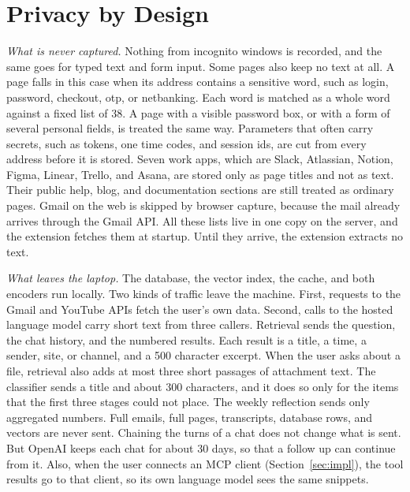 \documentclass[conference]{IEEEtran}
\begin{document}
\section{Privacy by Design}\label{sec:privacy}
\textit{What is never captured.} Nothing from incognito windows is recorded, and the same goes for typed text and form input. Some pages also keep no text at all. A page falls in this case when its address contains a sensitive word, such as login, password, checkout, otp, or netbanking. Each word is matched as a whole word against a fixed list of 38. A page with a visible password box, or with a form of several personal fields, is treated the same way. Parameters that often carry secrets, such as tokens, one time codes, and session ids, are cut from every address before it is stored. Seven work apps, which are Slack, Atlassian, Notion, Figma, Linear, Trello, and Asana, are stored only as page titles and not as text. Their public help, blog, and documentation sections are still treated as ordinary pages. Gmail on the web is skipped by browser capture, because the mail already arrives through the Gmail API. All these lists live in one copy on the server, and the extension fetches them at startup. Until they arrive, the extension extracts no text.

\textit{What leaves the laptop.} The database, the vector index, the cache, and both encoders run locally. Two kinds of traffic leave the machine. First, requests to the Gmail and YouTube APIs fetch the user's own data. Second, calls to the hosted language model carry short text from three callers. Retrieval sends the question, the chat history, and the numbered results. Each result is a title, a time, a sender, site, or channel, and a 500 character excerpt. When the user asks about a file, retrieval also adds at most three short passages of attachment text. The classifier sends a title and about 300 characters, and it does so only for the items that the first three stages could not place. The weekly reflection sends only aggregated numbers. Full emails, full pages, transcripts, database rows, and vectors are never sent. Chaining the turns of a chat does not change what is sent. But OpenAI keeps each chat for about 30 days, so that a follow up can continue from it. Also, when the user connects an MCP client (Section~\ref{sec:impl}), the tool results go to that client, so its own language model sees the same snippets.
\end{document}
